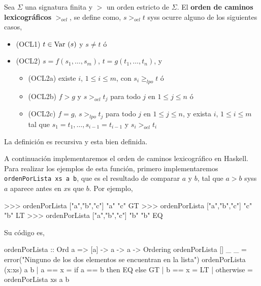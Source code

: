 \begin{defi}
  Sea $\Sigma$ una signatura finita y $>$ un orden estricto de
  $\Sigma$. El \textbf{orden de caminos lexicográficos} $>_{ocl}$, se define
  como, $s>_{ocl}t$ syss ocurre alguno de los siguientes casos,
  \begin{itemize}
  \item (OCL1) $t \in \mbox{Var }(s)$ y $s \not = t$ ó
  \item (OCL2) $s = f(s_1, \dots, s_m)$, $t = g(t_1, \dots, t_n)$, y
    \begin{itemize}
    \item (OCL2a) existe $i$, $1 \leq i \leq m$, con
      $s_i \geq_{lpo} t$ ó
    \item (OCL2b) $f > g$ y $s >_{ocl} t_j$ para todo $j$ en
      $1 \leq j \leq n$ ó
    \item (OCL2c) $f = g$, $s >_{lpo} t_j$ para todo $j$ en
      $1 \leq j \leq n$, y exista $i$, $1 \leq i \leq m$ tal que
      $s_1 = t_1, \dots, s_{i-1} = t_{i-1}$ y $s_i >_{ocl} t_i$
    \end{itemize}
  \end{itemize}
\end{defi}

La definición es recursiva y esta bien definida.




A continuación implementaremos el orden de caminos lexicográfico en
Haskell. Para realizar los ejemplos de esta función, primero
implementaremos \texttt{ordenPorLista xs a b}, que es el resultado de
comparar $a$ y $b$, tal que $a > b$ syss $a$ aparece antes en $x$s que
$b$. Por ejemplo,

\begin{sesion}
>>> ordenPorLista ["a","b","c"] "a" "c"
GT
>>> ordenPorLista ["a","b","c"] "c" "b"
LT
>>> ordenPorLista ["a","b","c"] "b" "b"
EQ
\end{sesion}

Su código es,

\begin{codigo}
ordenPorLista :: Ord a => [a] -> a  -> a -> Ordering
ordenPorLista [] _ _ =
  error("Ninguno de los dos elementos se encuentran
         en la lista")
ordenPorLista (x:xs) a b
  | a == x = if a == b
             then EQ
             else GT
  | b == x = LT
  | otherwise = ordenPorLista xs a b
\end{codigo}

